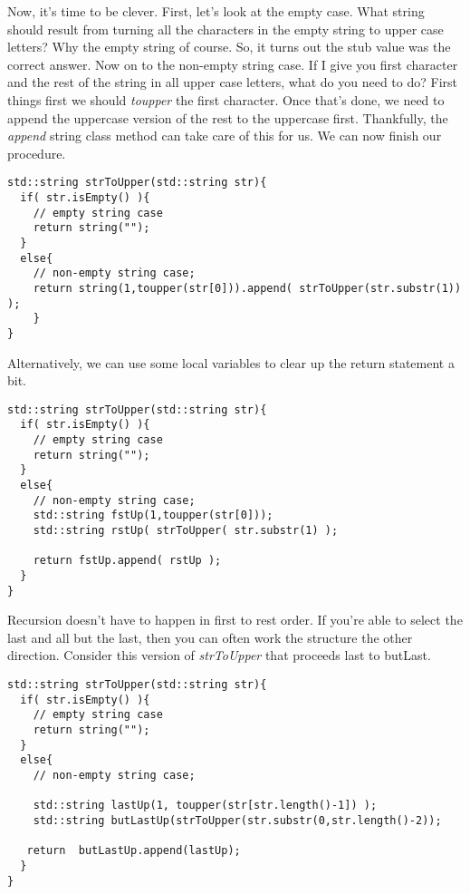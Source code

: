\documentclass[]{tufte-handout}
\begin{document}
Now, it's time to be clever. First, let's look at the empty case.  What string should result from turning all the characters in the empty string to upper case letters?  Why the empty string of course.  So, it turns out the stub value was the correct answer.  Now on to the non-empty string case.  If I give you first character and the rest of the string in all upper case letters, what do you need to do?  First things first we should \textit{toupper} the first character.  Once that's done, we need to append the uppercase version of the rest to the uppercase first.  Thankfully, the \textit{append} string class method can take care of this for us. We can now finish our procedure.
\begin{verbatim}
std::string strToUpper(std::string str){
  if( str.isEmpty() ){
    // empty string case
    return string("");
  } 
  else{ 
    // non-empty string case;
    return string(1,toupper(str[0])).append( strToUpper(str.substr(1)) );
    }
}
\end{verbatim}
Alternatively, we can use some local variables to clear up the return statement a bit.
\begin{verbatim}
std::string strToUpper(std::string str){
  if( str.isEmpty() ){
    // empty string case
    return string("");
  } 
  else{ 
    // non-empty string case;
    std::string fstUp(1,toupper(str[0]));
    std::string rstUp( strToUpper( str.substr(1) );
    
    return fstUp.append( rstUp );
  }
}
\end{verbatim}

Recursion doesn't have to happen in first to rest order.  If you're able to select the last and all but the last, then you
can often work the structure the other direction.  Consider this version of \textit{strToUpper} that proceeds last to butLast.  
\begin{verbatim}
std::string strToUpper(std::string str){
  if( str.isEmpty() ){
    // empty string case
    return string("");
  } 
  else{ 
    // non-empty string case;
	
    std::string lastUp(1, toupper(str[str.length()-1]) );
    std::string butLastUp(strToUpper(str.substr(0,str.length()-2));

   return  butLastUp.append(lastUp);
  } 
}
\end{verbatim}
\end{document}
